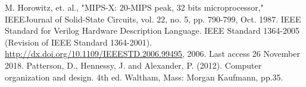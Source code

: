 \documentclass[conference]{IEEEtran}
\begin{document}
\begin{thebibliography}{00}
 M. Horowitz, et. al., "MIPS-X: 20-MIPS peak, 32 bits microprocessor," IEEEJournal of Solid-State Circuits, vol. 22, no. 5, pp. 790-799, Oct. 1987.
 IEEE Standard for Verilog Hardware Description Language. IEEE Standard 1364-2005 (Revision of IEEE Standard 1364-2001). \url{http://dx.doi.org/10.1109/IEEESTD.2006.99495}, 2006. Last access 26 November 2018.
 Patterson, D., Hennessy, J. and Alexander, P. (2012). Computer organization and design. 4th ed. Waltham, Mass: Morgan Kaufmann, pp.35.
\end{thebibliography}
\vspace{12pt}
\end{document}
